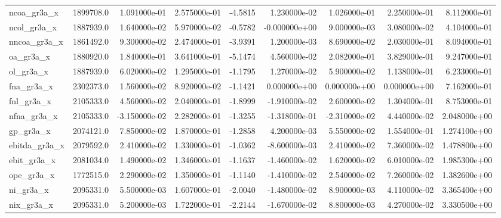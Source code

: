 \documentclass[10pt]{article}
\begin{document}
\begin{landscape}
\begin{longtable}{|l|r|r|r|r|r|r|r|r|}
ncoa\_gr3a\_x             &  1899708.0 &  1.091000e-01 &  2.575000e-01 &     -4.5815 &  1.230000e-02 &  1.026000e-01 &  2.250000e-01 &  8.112000e-01 \\
ncol\_gr3a\_x             &  1887939.0 &  1.640000e-02 &  5.970000e-02 &     -0.5782 & -0.000000e+00 &  9.000000e-03 &  3.080000e-02 &  4.104000e-01 \\
nncoa\_gr3a\_x            &  1861492.0 &  9.300000e-02 &  2.474000e-01 &     -3.9391 &  1.200000e-03 &  8.690000e-02 &  2.030000e-01 &  8.094000e-01 \\
oa\_gr3a\_x               &  1880920.0 &  1.840000e-01 &  3.641000e-01 &     -5.1474 &  4.560000e-02 &  2.082000e-01 &  3.829000e-01 &  9.247000e-01 \\
ol\_gr3a\_x               &  1887939.0 &  6.020000e-02 &  1.295000e-01 &     -1.1795 &  1.270000e-02 &  5.900000e-02 &  1.138000e-01 &  6.233000e-01 \\
fna\_gr3a\_x              &  2302373.0 &  1.560000e-02 &  8.920000e-02 &     -1.1421 &  0.000000e+00 &  0.000000e+00 &  0.000000e+00 &  7.162000e-01 \\
fnl\_gr3a\_x              &  2105333.0 &  4.560000e-02 &  2.040000e-01 &     -1.8999 & -1.910000e-02 &  2.600000e-02 &  1.304000e-01 &  8.753000e-01 \\
nfna\_gr3a\_x             &  2105333.0 & -3.150000e-02 &  2.282000e-01 &     -1.3255 & -1.318000e-01 & -2.310000e-02 &  4.440000e-02 &  2.048000e+00 \\
gp\_gr3a\_x               &  2074121.0 &  7.850000e-02 &  1.870000e-01 &     -1.2858 &  4.200000e-03 &  5.550000e-02 &  1.554000e-01 &  1.274100e+00 \\
ebitda\_gr3a\_x           &  2079592.0 &  2.410000e-02 &  1.330000e-01 &     -1.0362 & -8.600000e-03 &  2.410000e-02 &  7.360000e-02 &  1.478800e+00 \\
ebit\_gr3a\_x             &  2081034.0 &  1.490000e-02 &  1.346000e-01 &     -1.1637 & -1.460000e-02 &  1.620000e-02 &  6.010000e-02 &  1.985300e+00 \\
ope\_gr3a\_x              &  1772515.0 &  2.290000e-02 &  1.350000e-01 &     -1.1140 & -1.410000e-02 &  2.540000e-02 &  7.260000e-02 &  1.382600e+00 \\
ni\_gr3a\_x               &  2095331.0 &  5.500000e-03 &  1.607000e-01 &     -2.0040 & -1.480000e-02 &  8.900000e-03 &  4.110000e-02 &  3.365400e+00 \\
nix\_gr3a\_x              &  2095331.0 &  5.200000e-03 &  1.722000e-01 &     -2.2144 & -1.670000e-02 &  8.800000e-03 &  4.270000e-02 &  3.330500e+00 \\

\end{longtable}
\end{landscape}
\end{document}
